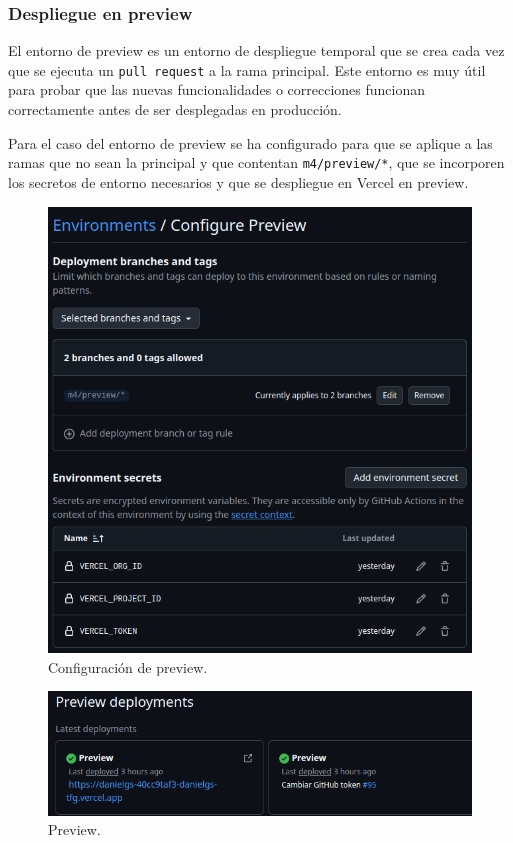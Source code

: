 \subsubsection{Despliegue en preview}

El entorno de preview es un entorno de despliegue temporal que se crea cada vez que se ejecuta un \texttt{pull request} a la rama principal. Este entorno es muy útil para probar que las nuevas funcionalidades o correcciones funcionan correctamente antes de ser desplegadas en producción.

Para el caso del entorno de preview se ha configurado para que se aplique a las ramas que no sean la principal y que contentan \texttt{m4/preview/*}, que se incorporen los secretos de entorno necesarios y que se despliegue en Vercel en preview.

\begin{figure}[H]
    \caption{Configuración de preview.}
    \centering
    \vspace*{0.5cm}
    \includegraphics[scale=0.35]{figuras/entorno_prev.png}
\end{figure}

\begin{figure}[H]
    \caption{Preview.}
    \centering
    \vspace*{0.5cm}
    \includegraphics[scale=0.35]{figuras/despliegue_prev.png}
\end{figure}

